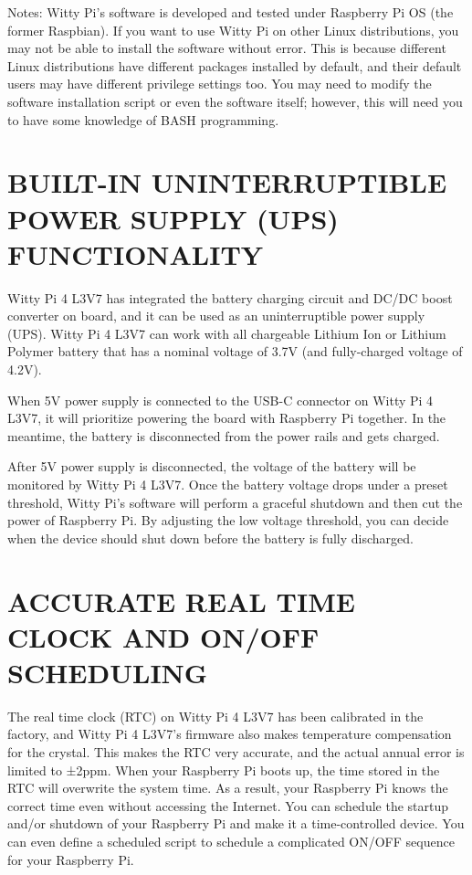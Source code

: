 \documentclass{article}\usepackage[]{graphicx}\usepackage[]{xcolor}
\begin{document}
Notes: Witty Pi’s software is developed and tested under Raspberry Pi OS (the former Raspbian). If you want to use Witty Pi on other Linux distributions, you may not be able to install the software without error. This is because different Linux distributions have different packages installed by default, and their default users may have different privilege settings too. You may need to modify the software installation script or even the software itself; however, this will need you to have some knowledge of BASH programming.

\section{BUILT-IN UNINTERRUPTIBLE POWER SUPPLY (UPS) FUNCTIONALITY}

Witty Pi 4 L3V7 has integrated the battery charging circuit and DC/DC boost converter on board, and it can be used as an uninterruptible power supply (UPS). Witty Pi 4 L3V7 can work with all chargeable Lithium Ion or Lithium Polymer battery that has a nominal voltage of 3.7V (and fully-charged voltage of 4.2V).

When 5V power supply is connected to the USB-C connector on Witty Pi 4 L3V7, it will prioritize powering the board with Raspberry Pi together. In the meantime, the battery is disconnected from the power rails and gets charged.

After 5V power supply is disconnected, the voltage of the battery will be monitored by Witty Pi 4 L3V7. Once the battery voltage drops under a preset threshold, Witty Pi’s software will perform a graceful shutdown and then cut the power of Raspberry Pi. By adjusting the low voltage threshold, you can decide when the device should shut down before the battery is fully discharged.

\section{ACCURATE REAL TIME CLOCK AND ON/OFF SCHEDULING}

The real time clock (RTC) on Witty Pi 4 L3V7 has been calibrated in the factory, and Witty Pi 4 L3V7’s firmware also makes temperature compensation for the crystal. This makes the RTC very accurate, and the actual annual error is limited to ±2ppm. When your Raspberry Pi boots up, the time stored in the RTC will overwrite the system time. As a result, your Raspberry Pi knows the correct time even without accessing the Internet. You can schedule the startup and/or shutdown of your Raspberry Pi and make it a time-controlled device. You can even define a scheduled script to schedule a complicated ON/OFF sequence for your Raspberry Pi.
\end{document}
